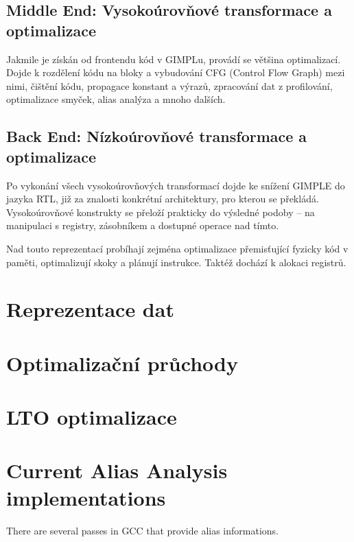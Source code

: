 \subsection{Middle End: Vysokoúrovňové transformace a optimalizace}

Jakmile je získán od frontendu kód v GIMPLu, provádí se většina optimalizací.
Dojde k rozdělení kódu na bloky a vybudování CFG (Control Flow Graph) mezi nimi,
čištění kódu, propagace konstant a výrazů, zpracování dat z profilování,
optimalizace smyček, alias analýza a mnoho dalších.

\subsection{Back End: Nízkoúrovňové transformace a optimalizace}

Po vykonání všech vysokoúrovňových transformací dojde ke snížení GIMPLE do
jazyka RTL, již za znalosti konkrétní architektury, pro kterou se překládá.
Vysokoúrovňové konstrukty se přeloží prakticky do výsledné podoby -- na
manipulaci s registry, zásobníkem a dostupné operace nad tímto.

Nad touto reprezentací probíhají zejména optimalizace přemisťující fyzicky kód v
paměti, optimalizují skoky a plánují instrukce. Taktéž dochází k alokaci
registrů.

\section{Reprezentace dat}

\section{Optimalizační průchody}

\section{LTO optimalizace}

\section{Current Alias Analysis implementations}

There are several passes in GCC that provide alias informations.

